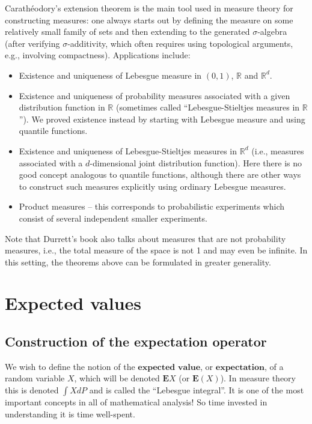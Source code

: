 \documentclass[11pt]{report}
\newcommand{\R}{\mathbb{R}}
\theoremstyle{plain}
\theoremstyle{definition}
\begin{document}
Carathéodory's extension theorem is the main tool
used in measure theory for constructing measures: one
always starts out by defining the measure on some
relatively small family of sets and then extending to
the generated $\sigma$-algebra (after verifying
$\sigma$-additivity, which often requires using
topological arguments, e.g., involving compactness).
Applications include:

\begin{itemize}
\item Existence and uniqueness of Lebesgue measure in
$(0,1)$, $\R$ and $\R^d$.

\item Existence and uniqueness of probability measures
associated with a given distribution function in $\R$
(sometimes called ``Lebesgue-Stieltjes measures in
$\R$''). We proved existence instead by starting with
Lebesgue measure and using quantile functions.

\item Existence and uniqueness of Lebesgue-Stieltjes
measures in $\R^d$ (i.e., measures associated with a
$d$-dimensional joint distribution function). Here
there is no good concept analogous to quantile
functions, although there are other ways to construct
such measures explicitly using ordinary Lebesgue
measures.

\item Product measures -- this corresponds to probabilistic
experiments which consist of several independent
smaller experiments.
\end{itemize}

Note that Durrett's book also talks about measures
that are not probability measures, i.e., the total
measure of the space is not 1 and may even be
infinite. In this setting, the theorems above can be
formulated in greater generality.

\chapter{Expected values}

\section{Construction of the expectation operator}
We wish to define the notion of the
$\textbf{expected value}$, or $\textbf{expectation}$,
of a random variable $X$, which will be denoted
$\mathbf{E} X$ (or $\mathbf{E}(X)$). In measure
theory this is denoted $\int X dP$ and is called the
``Lebesgue integral''. It is one of the most important
concepts in all of mathematical analysis! So time
invested in understanding it is time well-spent.
\end{document}
